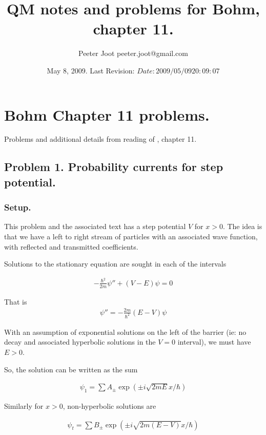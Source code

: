 \documentclass{article}
\title{ QM notes and problems for Bohm, chapter 11. }
\author{Peeter Joot \quad peeter.joot@gmail.com }
\date{ May 8, 2009.  Last Revision: $Date: 2009/05/09 20:09:07 $ }
\begin{document}
\maketitle{}
\tableofcontents
\section{ Bohm Chapter 11 problems. }

Problems and additional details from reading of \cite{bohm1989qt}, chapter 11.

\subsection{ Problem 1.  Probability currents for step potential. }

\subsubsection{ Setup. }

This problem and the associated text has a step potential $V$ for $x>0$.  The 
idea is that we have a left to right stream of particles with an associated
wave function, with reflected and transmitted coefficients.

Solutions to the stationary equation are sought in each of the intervals

\begin{align}
-\frac{\hbar^2}{2m}\psi'' + (V-E)\psi = 0
\end{align}

That is
\begin{align}
\psi'' = - \frac{2m}{\hbar^2} (E-V)\psi 
\end{align}

With an assumption of exponential solutions on the left of the barrier
(ie: no decay and associated hyperbolic solutions in the $V=0$ interval),
we must have $E>0$.

So, the solution can be written as the sum

\begin{align*}
\psi_1 = \sum A_{\pm} \exp\left( \pm i \sqrt{2mE} x / \hbar \right)
\end{align*}

Similarly for $x>0$, non-hyperbolic solutions are

\begin{align*}
\psi_t = \sum B_{\pm} \exp\left( \pm i \sqrt{2m(E-V)} x / \hbar \right)
\end{align*}
\end{document}
